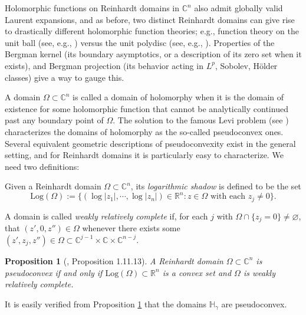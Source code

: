 \documentclass[letterpaper,11pt,reqno]{amsart}
\theoremstyle{plain}
\newtheorem{proposition}[equation]{Proposition}
\theoremstyle{definition}
\theoremstyle{remark}
\theoremstyle{remark}
\numberwithin{equation}{section}
\newcommand{\C}{{\mathbb C}}
\newcommand{\h}{{\mathbb H}}
\newcommand{\R}{{\mathbb R}}
\begin{document}
Holomorphic functions on Reinhardt domains in $\C^n$ also admit globally valid Laurent expansions, and as before, two distinct Reinhardt domains can give rise to drastically different holomorphic function theories; e.g., function theory on the unit ball (see, e.g., \cite{Rudin-BallBook}) versus the unit polydisc (see, e.g., \cite{Rudin-PolydiscBook}).
Properties of the Bergman kernel (its boundary asymptotics, or a description of its zero set when it exists), and Bergman projection (its behavior acting in $L^p$, Sobolev, Hölder classes) give a way to gauge this.

A domain $\Omega \subset \C^n$ is called a domain of holomorphy when it is the domain of existence for some holomorphic function that cannot be analytically continued past any boundary point of $\Omega$.
The solution to the famous Levi problem (see \cite{Siu_LeviProblemSurvey,Krantz_scv_book}) characterizes the domains of holomorphy as the so-called pseudoconvex ones. 
Several equivalent geometric descriptions of pseudoconvexity exist in the general setting, and for Reinhardt domains it is particularly easy to characterize. 
We need two definitions:

Given a Reinhardt domain $\Omega \subset \C^n$, its {\em logarithmic shadow} is defined to be the set
\begin{equation*}
\mathrm{Log}(\Omega) := \{ (\log|z_1|,\cdots,\log|z_n|) \in \R^n : z \in \Omega \,\, \mathrm{with\,\,each} \,\, z_j \neq 0 \}.
\end{equation*}

A domain is called {\em weakly relatively complete} if, for each $j$ with $\Omega \cap \{z_j = 0\} \neq \varnothing$, that $(z',0,z'') \in \Omega$ whenever there exists some $(z',z_j,z'') \in \Omega \subset \C^{j-1} \times \C \times \C^{n-j}$.

\begin{proposition}[\cite{JarPflBook08}, Proposition 1.11.13]\label{P:Pseudoconvex-Reinhardt}
A Reinhardt domain $\Omega \subset \C^n$ is pseudoconvex if and only if $\mathrm{Log}(\Omega) \subset \R^n$ is a convex set and $\Omega$ is weakly relatively complete.
\end{proposition}

It is easily verified from Proposition \ref{P:Pseudoconvex-Reinhardt} that the domains $\h_\gamma$ are pseudoconvex.
\end{document}
